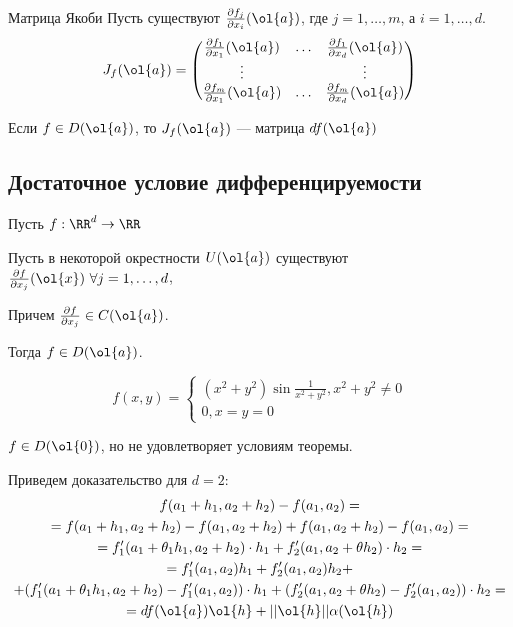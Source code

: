 \begin{defn}{Матрица Якоби}{}
    Пусть существуют \( \frac{\partial f_j}{\partial x_i} (\ol{a}) \),
    где \( j = 1, \ldots, m \), а \( i = 1, \ldots, d \).
    \[
        J_f (\ol{a}) = \begin{pmatrix}
            \frac{\partial f_1}{\partial x_1} (\ol{a}) & \ldots & \frac{\partial f_1}{\partial x_d} (\ol{a})
            \\
            \vdots & & \vdots
            \\
            \frac{\partial f_m}{\partial x_1} (\ol{a}) & \ldots & \frac{\partial f_m}{\partial x_d} (\ol{a})
        \end{pmatrix}
    \]

    Если \( f \in D(\ol{a}) \), то \( J_f (\ol{a}) \) --- матрица \( df(\ol{a}) \)
\end{defn}

\newpage

\subsection{Достаточное условие дифференцируемости}

\begin{thrm}{}{}
    Пусть \( f : \RR^d \to \RR \)

    Пусть в некоторой окрестности \( U(\ol{a}) \)
    существуют \( \frac{\partial f}{\partial x_j} (\ol{x}) \ \forall j = 1, \ldots, d \),

    Причем \( \frac{\partial f}{\partial x_j} \in C(\ol{a}) \).

    Тогда \( f \in D(\ol{a}) \).
\end{thrm}

\begin{example}{}{}
    \[
        f(x, y) = \begin{cases}
            (x^2 + y^2) \sin \frac{1}{x^2 + y^2}, x^2 + y^2 \neq 0
            \\
            0, x = y = 0
        \end{cases}
    \]

    \( f \in D(\ol{0}) \), но не удовлетворяет условиям теоремы.
\end{example}

Приведем доказательство для \( d = 2 \):
\begin{gather*}
    f(a_1 + h_1, a_2 + h_2) - f(a_1, a_2)
    =
    \\
    =
    f(a_1 + h_1, a_2 + h_2) - f(a_1, a_2 + h_2) + f(a_1, a_2 + h_2) - f(a_1, a_2)
    =
    \\
    =
    f_1'(a_1 + \theta_1 h_1, a_2 + h_2) \cdot h_1 + f_2'(a_1, a_2 + \theta h_2) \cdot h_2
    =
    \\
    =
    f_1'(a_1, a_2) h_1 + f_2'(a_1, a_2) h_2
        + \\
        + ( f_1'(a_1 + \theta_1 h_1, a_2 + h_2) - f_1'(a_1, a_2) ) \cdot h_1
        + ( f_2'(a_1, a_2 + \theta h_2) - f_2'(a_1, a_2) ) \cdot h_2
    =
    \\
    =
    df(\ol{a}) \ol{h} + || \ol{h} || \alpha(\ol{h})
\end{gather*}


